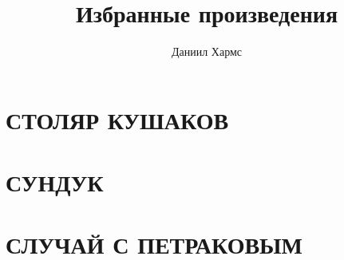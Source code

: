 \documentclass{book}
\title{Избранные произведения}
\author{Даниил Хармс}
\begin{document}
\maketitle

\chapter{СТОЛЯР КУШАКОВ}



\chapter{СУНДУК}



\chapter{}



\chapter{СЛУЧАЙ С ПЕТРАКОВЫМ}


\end{document}

